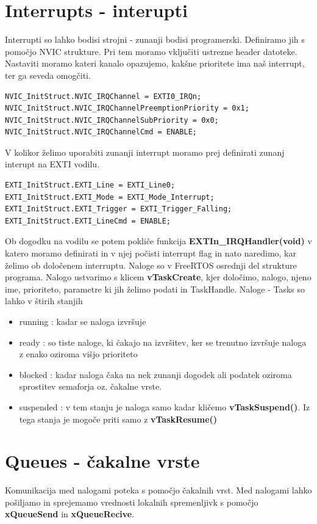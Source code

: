 \documentclass[12pt]{article}
\begin{document}
\section{Interrupts - interupti}
Interrupti so lahko bodisi strojni - zunanji bodisi programerski. Definiramo jih s pomočjo NVIC strukture. Pri tem moramo vključiti ustrezne header datoteke. Nastaviti moramo kateri kanalo opazujemo, kakšne prioritete ima naš interrupt, ter ga seveda omogčiti. 
\begin{lstlisting}[frame = single]
NVIC_InitStruct.NVIC_IRQChannel = EXTI0_IRQn;
NVIC_InitStruct.NVIC_IRQChannelPreemptionPriority = 0x1;
NVIC_InitStruct.NVIC_IRQChannelSubPriority = 0x0;
NVIC_InitStruct.NVIC_IRQChannelCmd = ENABLE;
\end{lstlisting} 
V kolikor želimo uporabiti zunanji interrupt moramo prej definirati zunanj interupt na EXTI vodilu.
\begin{lstlisting}[frame = single]
EXTI_InitStruct.EXTI_Line = EXTI_Line0;
EXTI_InitStruct.EXTI_Mode = EXTI_Mode_Interrupt;
EXTI_InitStruct.EXTI_Trigger = EXTI_Trigger_Falling;
EXTI_InitStruct.EXTI_LineCmd = ENABLE;
\end{lstlisting}
Ob dogodku na vodilu se potem pokliče funkcija \textbf{EXTIn\_IRQHandler(void)} v katero moramo definirati in v njej počisti interrupt flag in nato naredimo, kar želimo ob določenem interruptu. 
Naloge so v FreeRTOS osrednji del strukture programa. Nalogo ustvarimo s klicem \textbf{vTaskCreate}, kjer določimo, nalogo, njeno ime, prioriteto, parametre ki jih želimo podati in TaskHandle. 
Naloge - Tasks so lahko v štirih stanjih
\begin{itemize}
 \item running : kadar se naloga izvršuje 
 \item ready : so tiste naloge, ki čakajo na izvršitev, ker se trenutno izvršuje naloga z enako oziroma višjo prioriteto
 \item blocked : kadar naloga čaka na nek zunanji dogodek ali podatek oziroma sprostitev semaforja oz. čakalne vrste. 
 \item suspended : v tem stanju je naloga samo kadar kličemo \textbf{vTaskSuspend()}. Iz tega stanja je mogoče priti samo z \textbf{vTaskResume()}
\end{itemize}
\section {Queues - čakalne vrste}
Komunikacija med nalogami poteka s pomočjo čakalnih vrst. Med nalogami lahko pošiljamo in sprejemamo vrednosti lokalnih spremenljivk s pomočjo \textbf{ xQueueSend} in \textbf{ xQueueRecive}. 
\end{document}
